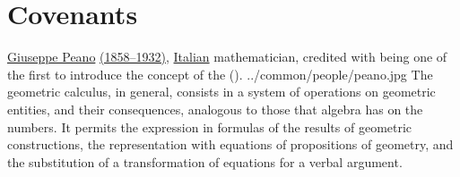 ﻿%





\chapter{Covenants}
\qboxnpq
  {\href{http://en.wikipedia.org/wiki/Giuseppe_Peano}{Giuseppe Peano}
   \href{http://www-history.mcs.st-andrews.ac.uk/Timelines/TimelineF.html}{(1858--1932)},
   \href{http://www-history.mcs.st-andrews.ac.uk/BirthplaceMaps/Places/Italy.html}{Italian} mathematician,
   credited with being one of the first to introduce the concept of the  ().}
  {../common/people/peano.jpg}
  {The geometric calculus, in general, 
   consists in a system of operations on geometric entities, and their consequences, 
   analogous to those that algebra has on the numbers.
   It permits the expression in formulas of the results of geometric constructions,
   the representation with equations of propositions of geometry,
   and the substitution of a transformation of equations for a verbal argument.}


